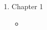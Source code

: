 \begin{enumerate}
    \item Chapter 1
    \begin{itemize}
        \item 
    \end{itemize}

\end{enumerate}